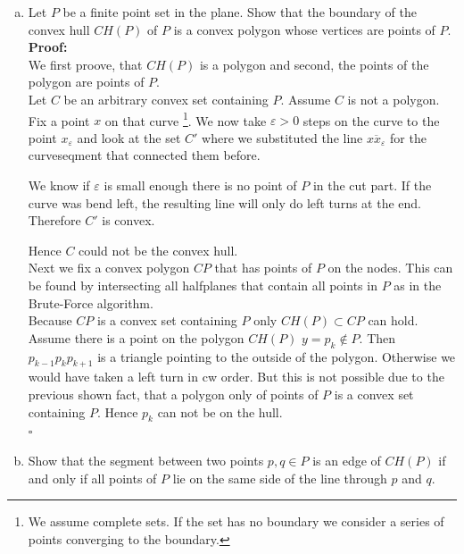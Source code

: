 \documentclass[11pt,a4paper,ngerman]{article}
\begin{document}
\begin{description}
\begin{enumerate}[a)]
    \item Let $P$ be a finite point set in the plane.
          Show that the boundary of the convex hull $CH(P)$ of $P$ is a convex polygon
          whose vertices are points of $P$. \\

     \textbf{Proof:}\\
     We first proove, that $CH(P)$ is a polygon and second, the 
     points of the polygon are points of $P$.\\

     Let $C$ be an arbitrary convex set containing $P$. Assume $C$ is
    not a polygon. Fix a point $x$ on that curve 
    \footnote{We assume complete sets. If the set has no boundary
    we consider a series of points converging to the boundary.}.
    We now take $\varepsilon > 0$ steps on the curve to the point
    $x_\varepsilon$ and look at the 
    set $C'$ where we substituted the line $\overline{xx_\varepsilon}$
    for the curveseqment that connected them before.

    We know if $\varepsilon$ is small enough there is no point of $P$
    in the cut part. If the curve was bend left, the resulting line will
    only do left turns at the end. Therefore $C'$ is convex.

    Hence $C$ could not be the convex hull.\\

    Next we fix a convex polygon $CP$ that has points of $P$ on the
    nodes. This can be found by intersecting all halfplanes that contain all
    points in $P$ as in the Brute-Force algorithm.\\

    Because $CP$ is a convex set containing $P$ only 
    $CH(P) \subset CP$ can hold.\\

    Assume there is a point on the polygon $CH(P)$ $y=p_k \not \in P$.
    Then $p_{k-1}p_kp_{k+1}$ is a triangle pointing to the outside
    of the polygon. Otherwise we would have taken a left turn in cw
    order.
    But this is not possible due to the previous shown fact, that
    a polygon only of points of $P$ is a convex set containing $P$.
    Hence $p_k$ can not be on the hull.\\
\mbox{}\hfill$\square$

    \item Show that the segment between two points $p, q \in P$ is an edge of $CH(P)$ if
          and only if all points of $P$ lie on the same side of the line through $p$ and $q$. \\


\end{enumerate}
\end{description}
\end{document}
